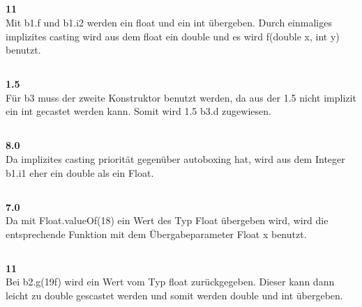 \documentclass[12pt]{article}
\begin{document}
\begin{center}
\subsection{}
\textbf{11}\\
Mit b1.f und b1.i2 werden ein float und ein int übergeben. Durch einmaliges implizites casting wird aus dem float ein double und es wird f(double x, int y) benutzt.

\subsection{}
\textbf{1.5}\\
Für b3 muss der zweite Konstruktor benutzt werden, da aus der 1.5 nicht implizit ein int gecastet werden kann.
Somit wird 1.5 b3.d zugewiesen.

\subsection{}
\textbf{8.0}\\
Da implizites casting priorität gegenüber autoboxing hat, wird aus dem Integer b1.i1 eher ein double als ein Float.

\subsection{}
\textbf{7.0}\\
Da mit Float.valueOf(18) ein Wert des Typ Float übergeben wird, wird die entsprechende Funktion mit dem Übergabeparameter Float x benutzt.

\subsection{}
\textbf{11}\\
Bei b2.g(19f) wird ein Wert vom Typ float zurückgegeben. Dieser kann dann leicht zu double gescastet werden und somit werden double und int übergeben.
\end{center}
\end{document}
